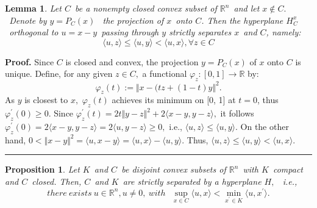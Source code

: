 \documentclass{article}
\newtheorem{lemma}[theorem]{Lemma}
\newtheorem{proposition}[theorem]{Proposition}
\newenvironment{proof}[1][Proof]{\noindent\textbf{#1.} }{\ \rule{0.5em}{0.5em}}
\begin{document}
\begin{lemma}
\textit{Let }$C$\textit{\ be a nonempty closed convex subset of }$%
\mathbb{R}
^{n}$\textit{\ and let }$x\notin C.$\textit{\ Denote by }$y=P_{C}(x)$\textit{%
\ the projection of }$x$\textit{\ onto }$C$\textit{. Then the hyperplane }$%
H_{C}^{x}$\textit{\ orthogonal to }$u=x-y$\textit{\ passing through }$y$ 
\textit{strictly separates }$x$\textit{\ and }$C$\textit{, namely:} 
\begin{equation*}
\langle u,z\rangle \leq \langle u,y\rangle <\langle u,x\rangle ,\forall z\in
C
\end{equation*}
\end{lemma}

\begin{proof}
Since $C$ is closed and convex, the projection $y=P_{C}(x)$ of $x$ onto $C$
is unique. Define, for any given $z\in C,$ a functional $\varphi
_{z}:[0,1]\longrightarrow 
\mathbb{R}
$ by:%
\begin{equation*}
\varphi _{z}(t):=\Vert x-(tz+(1-t)y\Vert ^{2}.
\end{equation*}%
As $y$ is closest to $x,$ $\varphi _{z}(t)$ achieves its minimum on [0, 1]
at $t=0$, thus $\varphi _{z}^{\prime }(0)\geq 0$. Since $\varphi
_{z}^{\prime }(t)=2t\Vert y-z\Vert ^{2}+2\langle x-y,y-z\rangle ,$ it
follows $\varphi _{z}^{\prime }(0)=2\langle x-y,y-z\rangle =2\langle
u,y-z\rangle \geq 0,$ i.e., $\langle u,z\rangle \leq \langle u,y\rangle .$
On the other hand, $0<\Vert x-y\Vert ^{2}=\langle u,x-y\rangle =\langle
u,x\rangle -\langle u,y\rangle .$ Thus, $\langle u,z\rangle \leq \langle
u,y\rangle <\langle u,x\rangle .$
\end{proof}

\begin{proposition}
\textit{Let }$K$\textit{\ and }$C$\textit{\ be disjoint convex subsets of }$%
\mathbb{R}
^{n}$\textit{\ with }$K$\textit{\ compact and }$C$\textit{\ closed. Then, }$%
C $\textit{\ and }$K$\textit{\ are strictly separated by a hyperplane }$H,$%
\textit{\ i.e., }%
\begin{equation*}
\mathit{there\ exists\ }u\in 
\mathbb{R}
^{n},u\neq 0,\mathit{\ with}\text{ }\sup_{x\in C}\langle u,x\rangle
<\min_{x^{\prime }\in K}\langle u,x^{\prime }\rangle .
\end{equation*}%
\bigskip
\end{proposition}
\end{document}
